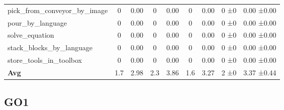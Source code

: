 \begin{table}[H]
{\begin{tabular}{l|c|c|c|c|c|c|c|c}
pick\_from\_conveyor\_by\_image & 0 & 0.00 & 0 & 0.00 & 0 & 0.00 & 0 ±0 & 0.00 ±0.00 \\
pour\_by\_language & 0 & 0.00 & 0 & 0.00 & 0 & 0.00 & 0 ±0 & 0.00 ±0.00 \\
solve\_equation & 0 & 0.00 & 0 & 0.00 & 0 & 0.00 & 0 ±0 & 0.00 ±0.00 \\
stack\_blocks\_by\_language & 0 & 0.00 & 0 & 0.00 & 0 & 0.00 & 0 ±0 & 0.00 ±0.00 \\
store\_tools\_in\_toolbox & 0 & 0.00 & 0 & 0.00 & 0 & 0.00 & 0 ±0 & 0.00 ±0.00 \\
\hline
\textbf{Avg} & 1.7 & 2.98 & 2.3 & 3.86 & 1.6 & 3.27 & 2 ±0 & 3.37 ±0.44 \\
\hline
\end{tabular}
}
\end{table}
\subsection{GO1}
\label{part:go1}

